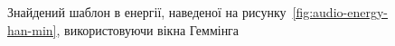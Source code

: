 \begin{figure}[!h]

            \caption{Знайдений шаблон в енергії, наведеної на рисунку~\ref{fig:audio-energy-han-min}, використовуючи
                вікна Геммінга}\label{fig:matched-energy-han-min-hamming}
        \end{figure}





